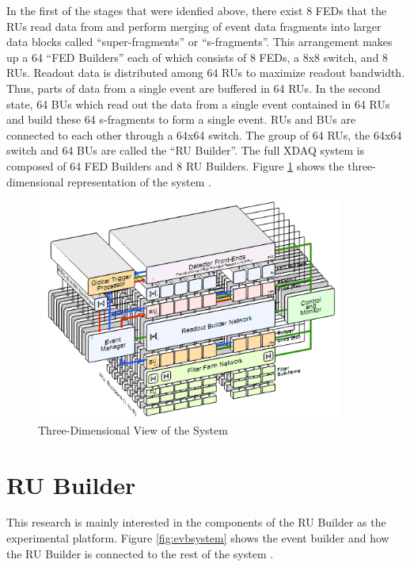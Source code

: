 In the first of the stages that were idenfied above, there exist 8 FEDs that the RUs read data from and perform merging of event data fragments into larger data blocks called ``super-fragments'' or ``s-fragments''. This arrangement makes up a 64 ``FED Builders'' each of which consists of 8 FEDs, a 8x8 switch, and 8 RUs. Readout data is distributed among 64 RUs to maximize readout bandwidth. Thus, parts of data from a single event are buffered in 64 RUs. In the second state, 64 BUs which read out the data from a single event contained in 64 RUs and build these 64 s-fragments to form a single event. RUs and BUs are connected to each other through a 64x64 switch. The group of 64 RUs, the 64x64 switch and 64 BUs are called the ``RU Builder''. The full XDAQ system is composed of 64 FED Builders and 8 RU Builders. Figure \ref{fig:3dxdaq} shows the three-dimensional representation of the system \cite{CMSTDR}.

\begin{figure}
	\centering
		\includegraphics[width=0.90\textwidth]{figures/3dxdaq.png}
	\caption{Three-Dimensional View of the System}
	\label{fig:3dxdaq}
\end{figure}



\section{RU Builder}

This research is mainly interested in the components of the RU Builder as the experimental platform. Figure \ref{fig:evbsystem} shows the event builder and how the RU Builder is connected to the rest of the system \cite{rubuilder}. 

